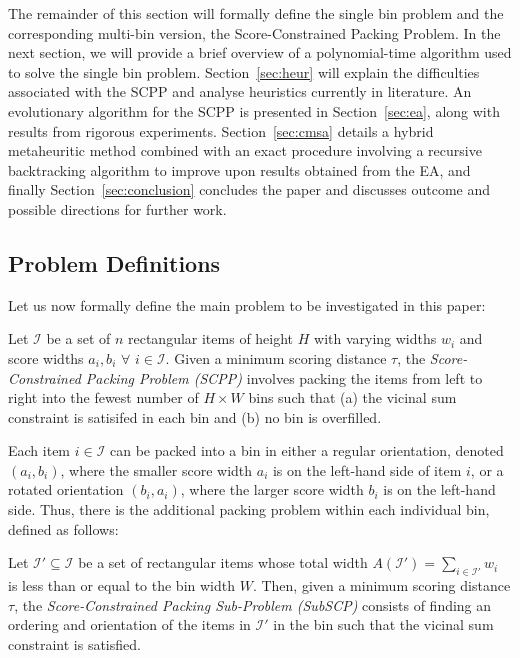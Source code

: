 \documentclass[authoryear]{elsarticle}
\begin{document}
\noindent The remainder of this section will formally define the single bin problem and the corresponding multi-bin version, the Score-Constrained Packing Problem. In the next section, we will provide a brief overview of a polynomial-time algorithm used to solve the single bin problem. Section~\ref{sec:heur} will explain the difficulties associated with the SCPP and analyse heuristics currently in literature. An evolutionary algorithm for the SCPP is presented in Section~\ref{sec:ea}, along with results from rigorous experiments. Section~\ref{sec:cmsa} details a hybrid metaheuritic method combined with an exact procedure involving a recursive backtracking algorithm to improve upon results obtained from the EA, and finally Section~\ref{sec:conclusion} concludes the paper and discusses outcome and possible directions for further work.

\subsection{Problem Definitions}
\label{sub:intro}

\noindent Let us now formally define the main problem to be investigated in this paper:

\begin{definition}
	Let $\mathcal{I}$ be a set of $n$ rectangular items of height $H$ with varying widths $w_i$ and score widths $a_i, b_i$ $\forall$ $i \in \mathcal{I}$. Given a minimum scoring distance $\tau$, the \emph{Score-Constrained Packing Problem (SCPP)} involves packing the items from left to right into the fewest number of $H \times W$ bins such that (a) the vicinal sum constraint is satisifed in each bin and (b) no bin is overfilled.
	\label{defn:scpp}
\end{definition}	

\noindent Each item $i \in \mathcal{I}$ can be packed into a bin in either a regular orientation, denoted $(a_i, b_i)$, where the smaller score width $a_i$ is on the left-hand side of item $i$, or a rotated orientation $(b_i, a_i)$, where the larger score width $b_i$ is on the left-hand side. Thus, there is the additional packing problem within each individual bin, defined as follows:

\begin{definition}
	Let $\mathcal{I}' \subseteq \mathcal{I}$ be a set of rectangular items whose total width $A(\mathcal{I}') = \sum_{i \in \mathcal{I}'} w_i$ is less than or equal to the bin width $W$. Then, given a minimum scoring distance $\tau$, the \emph{Score-Constrained Packing Sub-Problem (SubSCP)} consists of finding an ordering and orientation of the items in $\mathcal{I}'$ in the bin such that the vicinal sum constraint is satisfied.
	\label{defn:subscp}
\end{definition}
\end{document}
